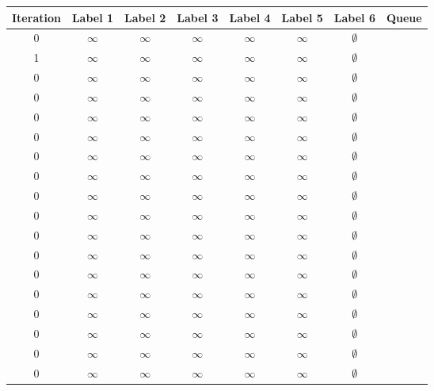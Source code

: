 \documentclass{scrartcl}
\begin{document}
\begin{table}[h]
  \centering

       \begin{tabular}{c|ccccccc}
          Iteration & Label 1 & Label 2 & Label 3 & Label 4 & Label 5 & Label 6 & Queue\\
          \hline\hline
          0       & $\infty$ & $\infty$ & $\infty$ & $\infty$ & $\infty$ & $\emptyset$ \\
          1       & $\infty$ & $\infty$ & $\infty$ & $\infty$ & $\infty$ & $\emptyset$ \\
          0       & $\infty$ & $\infty$ & $\infty$ & $\infty$ & $\infty$ & $\emptyset$ \\
          0       & $\infty$ & $\infty$ & $\infty$ & $\infty$ & $\infty$ & $\emptyset$ \\
          0       & $\infty$ & $\infty$ & $\infty$ & $\infty$ & $\infty$ & $\emptyset$ \\
          0       & $\infty$ & $\infty$ & $\infty$ & $\infty$ & $\infty$ & $\emptyset$ \\
          0       & $\infty$ & $\infty$ & $\infty$ & $\infty$ & $\infty$ & $\emptyset$ \\
          0       & $\infty$ & $\infty$ & $\infty$ & $\infty$ & $\infty$ & $\emptyset$ \\
          0       & $\infty$ & $\infty$ & $\infty$ & $\infty$ & $\infty$ & $\emptyset$ \\
          0       & $\infty$ & $\infty$ & $\infty$ & $\infty$ & $\infty$ & $\emptyset$ \\
          0       & $\infty$ & $\infty$ & $\infty$ & $\infty$ & $\infty$ & $\emptyset$ \\
          0       & $\infty$ & $\infty$ & $\infty$ & $\infty$ & $\infty$ & $\emptyset$ \\
          0       & $\infty$ & $\infty$ & $\infty$ & $\infty$ & $\infty$ & $\emptyset$ \\
          0       & $\infty$ & $\infty$ & $\infty$ & $\infty$ & $\infty$ & $\emptyset$ \\
          0       & $\infty$ & $\infty$ & $\infty$ & $\infty$ & $\infty$ & $\emptyset$ \\
          0       & $\infty$ & $\infty$ & $\infty$ & $\infty$ & $\infty$ & $\emptyset$ \\
          0       & $\infty$ & $\infty$ & $\infty$ & $\infty$ & $\infty$ & $\emptyset$ \\
          0       & $\infty$ & $\infty$ & $\infty$ & $\infty$ & $\infty$ & $\emptyset$ \\

\end{tabular}
\end{table}
\end{document}
